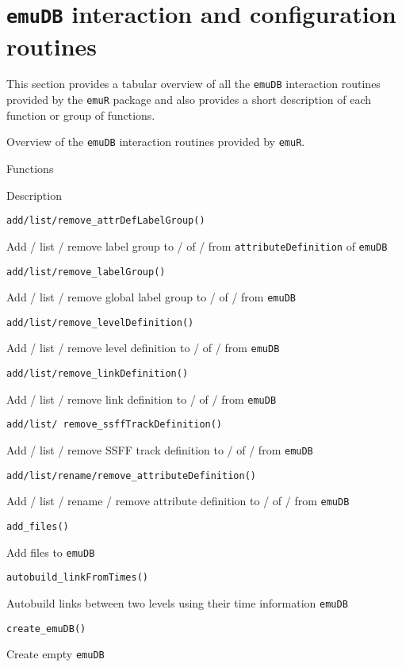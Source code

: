 \documentclass[
]{book}
\begin{document}
\hypertarget{sec:emuRpackageDetails-emuDBinteract}{%
\section{\texorpdfstring{\texttt{emuDB} interaction and configuration routines}{emuDB interaction and configuration routines}}\label{sec:emuRpackageDetails-emuDBinteract}}

This section provides a tabular overview of all the \texttt{emuDB} interaction routines provided by the \texttt{emuR} package and also provides a short description of each function or group of functions.

\label{tab:emuRpackageDetails-emuDBinteract}Overview of the \texttt{emuDB} interaction routines provided by \texttt{emuR}.

Functions

Description

\texttt{add/list/remove\_attrDefLabelGroup()}

Add / list / remove label group to / of / from \texttt{attributeDefinition} of \texttt{emuDB}

\texttt{add/list/remove\_labelGroup()}

Add / list / remove global label group to / of / from \texttt{emuDB}

\texttt{add/list/remove\_levelDefinition()}

Add / list / remove level definition to / of / from \texttt{emuDB}

\texttt{add/list/remove\_linkDefinition()}

Add / list / remove link definition to / of / from \texttt{emuDB}

\texttt{add/list/\ remove\_ssffTrackDefinition()}

Add / list / remove SSFF track definition to / of / from \texttt{emuDB}

\texttt{add/list/rename/remove\_attributeDefinition()}

Add / list / rename / remove attribute definition to / of / from \texttt{emuDB}

\texttt{add\_files()}

Add files to \texttt{emuDB}

\texttt{autobuild\_linkFromTimes()}

Autobuild links between two levels using their time information \texttt{emuDB}

\texttt{create\_emuDB()}

Create empty \texttt{emuDB}
\end{document}
